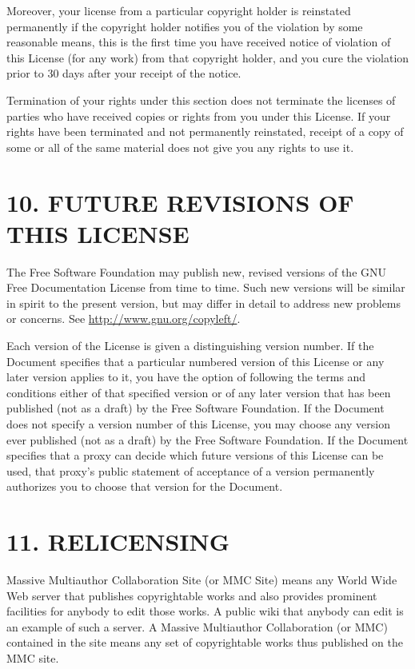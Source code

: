 \documentclass[captions=tableheading]{scrbook}
\begin{document}
\begin{example}
Moreover, your license from a particular copyright holder is reinstated permanently if the copyright holder notifies you of the violation by some reasonable means, this is the first time you have received notice of violation of this License (for any work) from that copyright holder, and you cure the violation prior to 30 days after your receipt of the notice. 

Termination of your rights under this section does not terminate the licenses of parties who have received copies or rights from you under this License. If your rights have been terminated and not permanently reinstated, receipt of a copy of some or all of the same material does not give you any rights to use it.
\section{10. FUTURE REVISIONS OF THIS LICENSE}
\label{sec-18-11}


The Free Software Foundation may publish new, revised versions of the GNU Free Documentation License from time to time. Such new versions will be similar in spirit to the present version, but may differ in detail to address new problems or concerns. See \href{http://www.gnu.org/copyleft/}{http://www.gnu.org/copyleft/}.

Each version of the License is given a distinguishing version number. If the Document specifies that a particular numbered version of this License or any later version applies to it, you have the option of following the terms and conditions either of that specified version or of any later version that has been published (not as a draft) by the Free Software Foundation. If the Document does not specify a version number of this License, you may choose any version ever published (not as a draft) by the Free Software Foundation. If the Document specifies that a proxy can decide which future versions of this License can be used, that proxy's public statement of acceptance of a version permanently authorizes you to choose that version for the Document.
\section{11. RELICENSING}
\label{sec-18-12}


Massive Multiauthor Collaboration Site (or MMC Site) means any World Wide Web server that publishes copyrightable works and also provides prominent facilities for anybody to edit those works. A public wiki that anybody can edit is an example of such a server. A Massive Multiauthor Collaboration (or MMC) contained in the site means any set of copyrightable works thus published on the MMC site.


\end{example}
\end{document}
